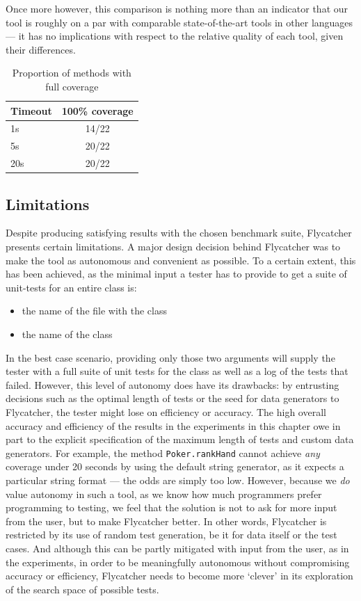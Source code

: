 Once more however, this comparison is nothing more than an indicator that our tool is roughly on a par with comparable state-of-the-art tools in other languages --- it has no implications with respect to the relative quality of each tool, given their differences.

\begin{table}[b]
\centering
\begin{tabular}{lc}
\toprule
\textbf{Timeout} & \textbf{100\% coverage} \\
\toprule
1s & 14/22 \\
5s & 20/22 \\
20s & 20/22 \\
\bottomrule
\end{tabular}
\caption{Proportion of methods with full coverage}
\label{covresults}
\end{table}


\subsection{Limitations}
Despite producing satisfying results with the chosen benchmark suite, \textsf{Flycatcher} presents certain limitations. A major design decision behind \textsf{Flycatcher} was to make the tool as autonomous and convenient as possible. To a certain extent, this has been achieved, as the minimal input a tester has to provide to get a suite of unit-tests for an entire class is:

\begin{itemize}
   \item the name of the file with the class
   \item the name of the class
\end{itemize}

In the best case scenario, providing only those two arguments will supply the tester with a full suite of unit tests for the class as well as a log of the tests that failed. However, this level of autonomy does have its drawbacks: by entrusting decisions such as the optimal length of tests or the seed for data generators to \textsf{Flycatcher}, the tester might lose on efficiency or accuracy. The high overall accuracy and efficiency of the results in the experiments in this chapter owe in part to the explicit specification of the maximum length of tests and custom data generators. For example, the method \texttt{Poker.rankHand} cannot achieve \emph{any} coverage under 20 seconds by using the default string generator, as it expects a particular string format --- the odds are simply too low. However, because we \emph{do} value autonomy in such a tool, as we know how much programmers prefer programming to testing, we feel that the solution is not to ask for more input from the user, but to make \textsf{Flycatcher} better. In other words, \textsf{Flycatcher} is restricted by its use of random test generation, be it for data itself or the test cases. And although this can be partly mitigated with input from the user, as in the experiments, in order to be meaningfully autonomous without compromising accuracy or efficiency, \textsf{Flycatcher} needs to become more `clever' in its exploration of the search space of possible tests.\\

